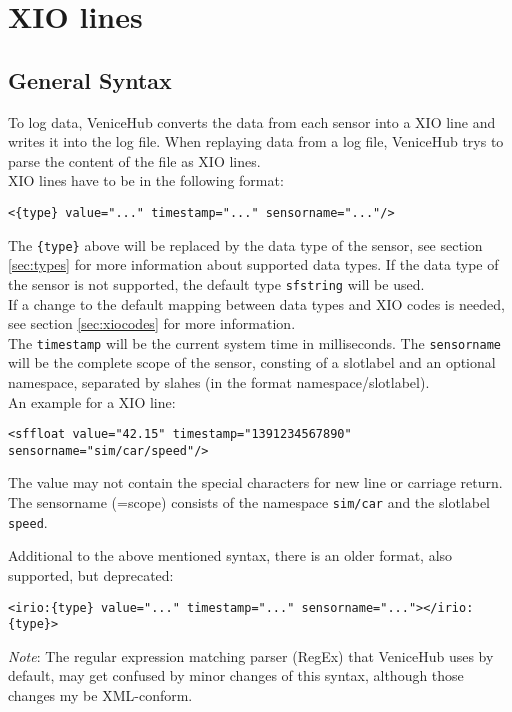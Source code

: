 \documentclass[german,a4paper]{article}
\begin{document}
\section{XIO lines}
\label{sec:XIO_lines}

\subsection{General Syntax}
To log data, VeniceHub converts the data from each sensor into a XIO line and writes it into the log file. When replaying data from a log file, VeniceHub trys to parse the content of the file as XIO lines.\\
XIO lines have to be in the following format:
\begin{lstlisting}
<{type} value="..." timestamp="..." sensorname="..."/>
\end{lstlisting}
The \texttt{\{type\}} above will be replaced by the data type of the sensor, see section \ref{sec:types} for more information about supported data types. If the data type of the sensor is not supported, the default type \texttt{sfstring} will be used.\\
If a change to the default mapping between data types and XIO codes is needed, see section \ref{sec:xiocodes} for more information.\\
The \texttt{timestamp} will be the current system time in milliseconds. The \texttt{sensorname} will be the complete scope of the sensor, consting of a slotlabel and an optional namespace, separated by slahes (in the format namespace/slotlabel).\\
An example for a XIO line:
\begin{lstlisting}
<sffloat value="42.15" timestamp="1391234567890" sensorname="sim/car/speed"/>
\end{lstlisting}
The value may not contain the special characters for new line or carriage return. The sensorname (=scope) consists of the namespace \texttt{sim/car} and the slotlabel \texttt{speed}.

Additional to the above mentioned syntax, there is an older format, also supported, but deprecated:
\begin{lstlisting}
<irio:{type} value="..." timestamp="..." sensorname="..."></irio:{type}>
\end{lstlisting}

\emph{Note}: The regular expression matching parser (RegEx) that VeniceHub uses by default, may get confused by minor changes of this syntax, although those changes my be XML-conform.
\end{document}
